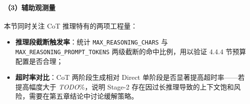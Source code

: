 \paragraph{（3）辅助观测量}
本节同时关注 CoT 推理特有的两项工程量：
\begin{itemize}
    \item \textbf{推理段截断触发率}：统计 \texttt{MAX\_REASONING\_CHARS} 与 \texttt{MAX\_REASONING\_PROMPT\_TOKENS} 两级截断的命中比例，用以验证 4.4.4 节预算配置是否合理；
    \item \textbf{超时率对比}：CoT 两阶段生成相对 Direct 单阶段是否显著提高超时率——若提高幅度大于 \textit{TODO}\%，说明 Stage-2 存在因过长推理导致的上下文饱和风险，需要在第五章结论中讨论缓解策略。
\end{itemize}
